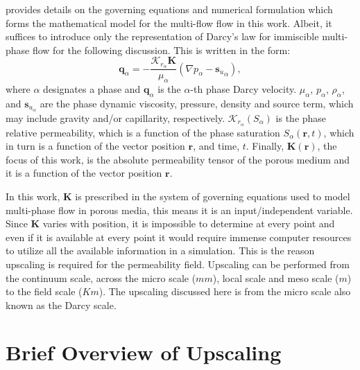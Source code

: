 \documentclass[preprint,12pt]{elsarticle}
\begin{document}
\cite{Gomes_2017} provides details on the governing equations and numerical formulation which forms the mathematical model for the multi-flow flow in this work. Albeit, it suffices to introduce only the representation of Darcy's law for immiscible multi-phase flow for the following discussion. This is written in the form:
\begin{equation}\label{e:darcy_eqn}
  \mathbf{q}_{\alpha} =
  -\frac{\mathcal{K}_{{r}_\alpha}\mathbf{K}}{\mu_{\alpha}}\left(
  \nabla p_{\alpha} - {\mathbf{s}_{u}}_{\alpha} \right),
\end{equation}
where $\alpha$ designates a phase and $\mathbf{q}_{\alpha}$ is the $\alpha$-th phase Darcy velocity. $\mu_{\alpha}$, $p_{\alpha}$, $\rho_{\alpha}$, and $\mathbf{s}_{{u}_\alpha}$ are the phase dynamic viscosity, pressure, density and source term, which may include gravity and/or capillarity, respectively. $\mathcal{K}_{{r}_\alpha}\left(S_{\alpha}\right)$ is the phase relative permeability, which is a function of the phase saturation $S_{\alpha}\left(\mathbf{r},t\right)$, which in turn is a function of the vector position $\mathbf{r}$, and time, $t$. Finally, $\mathbf{K}\left(\mathbf{r}\right)$, the focus of this work, is the absolute permeability tensor of the porous medium and it is a function of the vector position $\mathbf{r}$.

In this work, $\mathbf{K}$ is prescribed in the system of governing equations used to model multi-phase flow in porous media, this means it is an input/independent variable. Since $\mathbf{K}$ varies with position, it is impossible to determine at every point and even if it is available at every point it would require immense computer resources to utilize all the available information in a simulation. This is the reason upscaling is required for the permeability field. Upscaling can be performed from the continuum scale, across the micro scale ($mm$), local scale and meso scale ($m$) to the field scale ($Km$)\cite{ECMI_2004}. The upscaling discussed here is from the micro scale also known as the Darcy scale.

\section{Brief Overview of Upscaling}\label{section:overview_upscaling}
\end{document}
